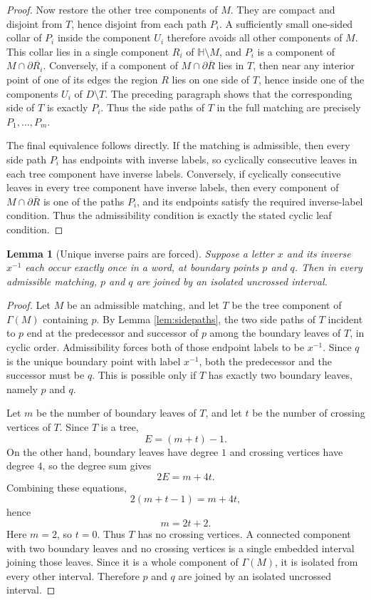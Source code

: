 \documentclass[12pt]{article}
\newcommand{\HH}{\mathbb{H}}
\newcommand{\bd}{\partial}
\newtheorem{lemma}[theorem]{Lemma}
\theoremstyle{definition}
\begin{document}
\begin{proof}
Now restore the other tree components of \(M\).  They are compact and disjoint from \(T\), hence disjoint from each path \(P_i\).  A sufficiently small one-sided collar of \(P_i\) inside the component \(U_i\) therefore avoids all other components of \(M\).  This collar lies in a single component \(R_i\) of \(\HH\setminus M\), and \(P_i\) is a component of \(M\cap\bd\overline{R_i}\).  Conversely, if a component of \(M\cap\bd\overline R\) lies in \(T\), then near any interior point of one of its edges the region \(R\) lies on one side of \(T\), hence inside one of the components \(U_i\) of \(D\setminus T\).  The preceding paragraph shows that the corresponding side of \(T\) is exactly \(P_i\).  Thus the side paths of \(T\) in the full matching are precisely \(P_1,\dots,P_m\).

The final equivalence follows directly.  If the matching is admissible, then every side path \(P_i\) has endpoints with inverse labels, so cyclically consecutive leaves in each tree component have inverse labels.  Conversely, if cyclically consecutive leaves in every tree component have inverse labels, then every component of \(M\cap\bd\overline R\) is one of the paths \(P_i\), and its endpoints satisfy the required inverse-label condition.  Thus the admissibility condition is exactly the stated cyclic leaf condition.
\end{proof}

\begin{lemma}[Unique inverse pairs are forced]\label{lem:unique}
Suppose a letter \(x\) and its inverse \(x^{-1}\) each occur exactly once in a word, at boundary points \(p\) and \(q\).  Then in every admissible matching, \(p\) and \(q\) are joined by an isolated uncrossed interval.
\end{lemma}

\begin{proof}
Let \(M\) be an admissible matching, and let \(T\) be the tree component of \(\Gamma(M)\) containing \(p\).  By Lemma \ref{lem:sidepaths}, the two side paths of \(T\) incident to \(p\) end at the predecessor and successor of \(p\) among the boundary leaves of \(T\), in cyclic order.  Admissibility forces both of those endpoint labels to be \(x^{-1}\).  Since \(q\) is the unique boundary point with label \(x^{-1}\), both the predecessor and the successor must be \(q\).  This is possible only if \(T\) has exactly two boundary leaves, namely \(p\) and \(q\).

Let \(m\) be the number of boundary leaves of \(T\), and let \(t\) be the number of crossing vertices of \(T\).  Since \(T\) is a tree,
\[
E=(m+t)-1.
\]
On the other hand, boundary leaves have degree \(1\) and crossing vertices have degree \(4\), so the degree sum gives
\[
2E=m+4t.
\]
Combining these equations,
\[
2(m+t-1)=m+4t,
\]
hence
\[
m=2t+2.
\]
Here \(m=2\), so \(t=0\).  Thus \(T\) has no crossing vertices.  A connected component with two boundary leaves and no crossing vertices is a single embedded interval joining those leaves.  Since it is a whole component of \(\Gamma(M)\), it is isolated from every other interval.  Therefore \(p\) and \(q\) are joined by an isolated uncrossed interval.
\end{proof}
\end{document}
